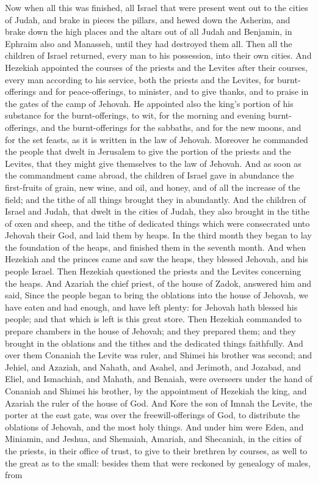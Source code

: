 Now when all this was finished, all Israel that were present went out to the cities of Judah, and brake in pieces the pillars, and hewed down the Asherim, and brake down the high places and the altars out of all Judah and Benjamin, in Ephraim also and Manasseh, until they had destroyed them all. Then all the children of Israel returned, every man to his possession, into their own cities.  And Hezekiah appointed the courses of the priests and the Levites after their courses, every man according to his service, both the priests and the Levites, for burnt-offerings and for peace-offerings, to minister, and to give thanks, and to praise in the gates of the camp of Jehovah. He appointed also the king’s portion of his substance for the burnt-offerings, to wit, for the morning and evening burnt-offerings, and the burnt-offerings for the sabbaths, and for the new moons, and for the set feasts, as it is written in the law of Jehovah. Moreover he commanded the people that dwelt in Jerusalem to give the portion of the priests and the Levites, that they might give themselves to the law of Jehovah. And as soon as the commandment came abroad, the children of Israel gave in abundance the first-fruits of grain, new wine, and oil, and honey, and of all the increase of the field; and the tithe of all things brought they in abundantly. And the children of Israel and Judah, that dwelt in the cities of Judah, they also brought in the tithe of oxen and sheep, and the tithe of dedicated things which were consecrated unto Jehovah their God, and laid them by heaps. In the third month they began to lay the foundation of the heaps, and finished them in the seventh month. And when Hezekiah and the princes came and saw the heaps, they blessed Jehovah, and his people Israel. Then Hezekiah questioned the priests and the Levites concerning the heaps. And Azariah the chief priest, of the house of Zadok, answered him and said, Since the people began to bring the oblations into the house of Jehovah, we have eaten and had enough, and have left plenty: for Jehovah hath blessed his people; and that which is left is this great store.  Then Hezekiah commanded to prepare chambers in the house of Jehovah; and they prepared them; and they brought in the oblations and the tithes and the dedicated things faithfully. And over them Conaniah the Levite was ruler, and Shimei his brother was second; and Jehiel, and Azaziah, and Nahath, and Asahel, and Jerimoth, and Jozabad, and Eliel, and Ismachiah, and Mahath, and Benaiah, were overseers under the hand of Conaniah and Shimei his brother, by the appointment of Hezekiah the king, and Azariah the ruler of the house of God. And Kore the son of Imnah the Levite, the porter at the east gate, was over the freewill-offerings of God, to distribute the oblations of Jehovah, and the most holy things. And under him were Eden, and Miniamin, and Jeshua, and Shemaiah, Amariah, and Shecaniah, in the cities of the priests, in their office of trust, to give to their brethren by courses, as well to the great as to the small: besides them that were reckoned by genealogy of males, from 